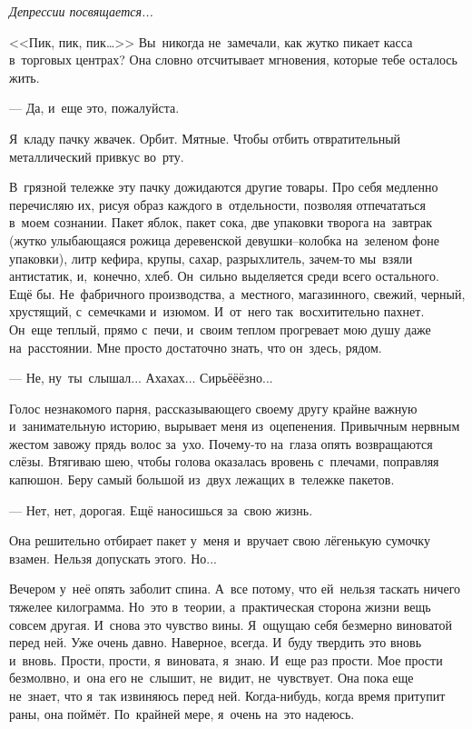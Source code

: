 \begin{flushright}
	\textit{Депрессии посвящается...}
\end{flushright}
\lettrine[lines=3, loversize=0.1]{<<П}{}ик, пик, пик…>>
Вы~никогда не~замечали, как жутко пикает касса в~торговых центрах? Она словно отсчитывает мгновения, которые тебе осталось жить.
 
 --- Да, и~еще это, пожалуйста.

Я~кладу пачку жвачек.
Орбит.
Мятные.
Чтобы отбить отвратительный металлический привкус во~рту.

В~грязной тележке эту пачку дожидаются другие товары.
Про себя медленно перечисляю их, рисуя образ каждого в~отдельности, позволяя отпечататься в~моем сознании.
Пакет яблок, пакет сока, две упаковки творога на~завтрак (жутко улыбающаяся рожица деревенской девушки--колобка на~зеленом фоне упаковки), литр кефира, крупы, сахар, разрыхлитель, зачем-то мы~взяли антистатик, и,~конечно, хлеб.
Он~сильно выделяется среди всего остального.
Ещё бы.
Не~фабричного производства, а~местного, магазинного, свежий, черный, хрустящий, с~семечками и~изюмом.
И~от~него так~восхитительно пахнет.
Он~еще теплый, прямо с~печи, и~своим теплом прогревает мою душу даже на~расстоянии.
Мне просто достаточно знать, что он~здесь, рядом.
 
 --- Не, ну~ты~слышал...
Ахахах...
Сирьёёёзно...

Голос незнакомого парня, рассказывающего своему другу крайне важную и~занимательную историю, вырывает меня из~оцепенения.
Привычным нервным жестом завожу прядь волос за~ухо.
Почему-то на~глаза опять возвращаются слёзы.
Втягиваю шею, чтобы голова оказалась вровень с~плечами, поправляя капюшон.
Беру самый большой из~двух лежащих в~тележке пакетов.

 --- Нет, нет, дорогая.
Ещё наносишься за~свою жизнь.

Она решительно отбирает пакет у~меня и~вручает свою лёгенькую сумочку взамен.
Нельзя допускать этого.
Но...
 
Вечером у~неё опять заболит спина.
А~все потому, что ей~нельзя таскать ничего тяжелее килограмма.
Но~это в~теории, а~практическая сторона жизни вещь совсем другая.
И~снова это чувство вины.
Я~ощущаю себя безмерно виноватой перед ней.
Уже очень давно.
Наверное, всегда.
И~буду твердить это вновь и~вновь.
Прости, прости, я~виновата, я~знаю.
И~еще раз прости.
Мое прости безмолвно, и~она его не~слышит, не~видит, не~чувствует.
Она пока еще не~знает, что я~так извиняюсь перед ней.
Когда-нибудь, когда время притупит раны, она поймёт.
По~крайней мере, я~очень на~это надеюсь.


